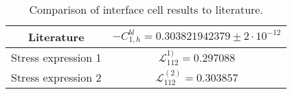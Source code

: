 \documentclass[12pt,a4paper]{article}
\begin{document}
\begin{table}[h!]
  \begin{center}
 \begin{tabular}{ | c | c |}
 \hline
 Literature & $-C_{1,h}^{bl} = 0.303821942379 \pm 2 \cdot 10^{-12}$ \\
 \hline
 Stress expression 1 & $ \mathcal{L}^{1)}_{112} = 0.297088 $ \\
 \hline
 Stress expression 2 & $ \mathcal{L}^{(2)}_{112} = 0.303857 $ \\
 \hline
  \end{tabular}
    \caption{Comparison of interface cell results to literature.}
  \label{tab:chan-slip-comp-cavity}
  \end{center}
\end{table}
\end{document}
